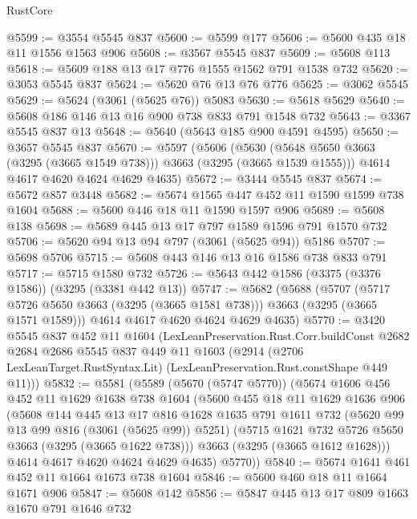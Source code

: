 \begin{lexlean}{RustCore}
\begin{coremodule}
@5599 := @3554 @5545 @837
@5600 := @5599 @177
@5606 := @5600 @435 @18 @11 @1556 @1563 @906
@5608 := @3567 @5545 @837
@5609 := @5608 @113
@5618 := @5609 @188 @13 @17 @776 @1555 @1562 @791 @1538 @732
@5620 := @3053 @5545 @837
@5624 := @5620 @76 @13 @76 @776
@5625 := @3062 @5545
@5629 := @5624 (@3061 (@5625 @76)) @5083
@5630 := @5618 @5629
@5640 := @5608 @186 @146 @13 @16 @900 @738 @833 @791 @1548 @732
@5643 := @3367 @5545 @837 @13
@5648 := @5640 (@5643 @185 @900 @4591 @4595)
@5650 := @3657 @5545 @837
@5670 := @5597
    (@5606
      (@5630 (@5648 @5650 @3663 (@3295 (@3665 @1549 @738))) @3663 (@3295 (@3665 @1539 @1555)))
      @4614
      @4617
      @4620
      @4624
      @4629
      @4635)
@5672 := @3444 @5545 @837
@5674 := @5672 @857 @3448
@5682 := @5674 @1565 @447 @452 @11 @1590 @1599 @738 @1604
@5688 := @5600 @446 @18 @11 @1590 @1597 @906
@5689 := @5608 @138
@5698 := @5689 @445 @13 @17 @797 @1589 @1596 @791 @1570 @732
@5706 := @5620 @94 @13 @94 @797 (@3061 (@5625 @94)) @5186
@5707 := @5698 @5706
@5715 := @5608 @443 @146 @13 @16 @1586 @738 @833 @791
@5717 := @5715 @1580 @732
@5726 := @5643 @442 @1586 (@3375 (@3376 @1586)) (@3295 (@3381 @442 @13))
@5747 := @5682
    (@5688
      (@5707 (@5717 @5726 @5650 @3663 (@3295 (@3665 @1581 @738))) @3663 (@3295 (@3665 @1571 @1589)))
      @4614
      @4617
      @4620
      @4624
      @4629
      @4635)
@5770 := @3420
    @5545
    @837
    @452
    @11
    @1604
    (LexLeanPreservation.Rust.Corr.buildConst
      @2682
      @2684
      @2686
      @5545
      @837
      @449
      @11
      @1603
      (@2914 (@2706 LexLeanTarget.RustSyntax.Lit) (LexLeanPreservation.Rust.constShape @449 @11)))
@5832 := @5581
    (@5589
      (@5670 (@5747 @5770))
      (@5674
        @1606
        @456
        @452
        @11
        @1629
        @1638
        @738
        @1604
        (@5600
          @455
          @18
          @11
          @1629
          @1636
          @906
          (@5608
            @144
            @445
            @13
            @17
            @816
            @1628
            @1635
            @791
            @1611
            @732
            (@5620 @99 @13 @99 @816 (@3061 (@5625 @99)) @5251)
            (@5715 @1621 @732 @5726 @5650 @3663 (@3295 (@3665 @1622 @738)))
            @3663
            (@3295 (@3665 @1612 @1628)))
          @4614
          @4617
          @4620
          @4624
          @4629
          @4635)
        @5770))
@5840 := @5674 @1641 @461 @452 @11 @1664 @1673 @738 @1604
@5846 := @5600 @460 @18 @11 @1664 @1671 @906
@5847 := @5608 @142
@5856 := @5847 @445 @13 @17 @809 @1663 @1670 @791 @1646 @732

\end{coremodule}
\end{lexlean}
